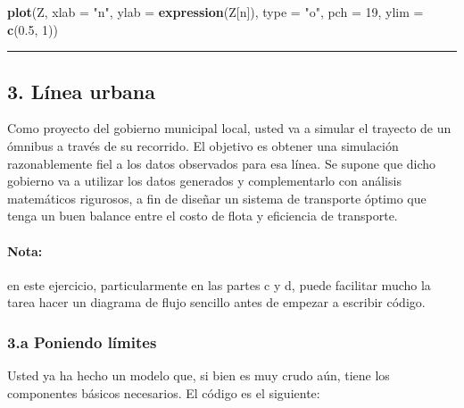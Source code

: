 \documentclass[]{article}
\newenvironment{Shaded}{}{}
\newcommand{\KeywordTok}[1]{\textcolor[rgb]{0.00,0.44,0.13}{\textbf{{#1}}}}
\newcommand{\DataTypeTok}[1]{\textcolor[rgb]{0.56,0.13,0.00}{{#1}}}
\newcommand{\DecValTok}[1]{\textcolor[rgb]{0.25,0.63,0.44}{{#1}}}
\newcommand{\FloatTok}[1]{\textcolor[rgb]{0.25,0.63,0.44}{{#1}}}
\newcommand{\StringTok}[1]{\textcolor[rgb]{0.25,0.44,0.63}{{#1}}}
\newcommand{\NormalTok}[1]{{#1}}
\begin{document}
\begin{Shaded}
\begin{Highlighting}[]
\KeywordTok{plot}\NormalTok{(Z, }\DataTypeTok{xlab =} \StringTok{"n"}\NormalTok{, }\DataTypeTok{ylab =} \KeywordTok{expression}\NormalTok{(Z[n]), }\DataTypeTok{type =} \StringTok{"o"}\NormalTok{, }\DataTypeTok{pch =} \DecValTok{19}\NormalTok{, }\DataTypeTok{ylim =} \KeywordTok{c}\NormalTok{(}\FloatTok{0.5}\NormalTok{, }
    \DecValTok{1}\NormalTok{))}
\end{Highlighting}
\end{Shaded}
\begin{center}\rule{3in}{0.4pt}\end{center}

\subsection{3. Línea urbana}

Como proyecto del gobierno municipal local, usted va a simular el
trayecto de un ómnibus a través de su recorrido. El objetivo es obtener
una simulación razonablemente fiel a los datos observados para esa
línea. Se supone que dicho gobierno va a utilizar los datos generados y
complementarlo con análisis matemáticos rigurosos, a fin de diseñar un
sistema de transporte óptimo que tenga un buen balance entre el costo de
flota y eficiencia de transporte.

\paragraph{Nota:}

en este ejercicio, particularmente en las partes c y d, puede facilitar
mucho la tarea hacer un diagrama de flujo sencillo antes de empezar a
escribir código.

\subsubsection{3.a Poniendo límites}

Usted ya ha hecho un modelo que, si bien es muy crudo aún, tiene los
componentes básicos necesarios. El código es el siguiente:
\end{document}
